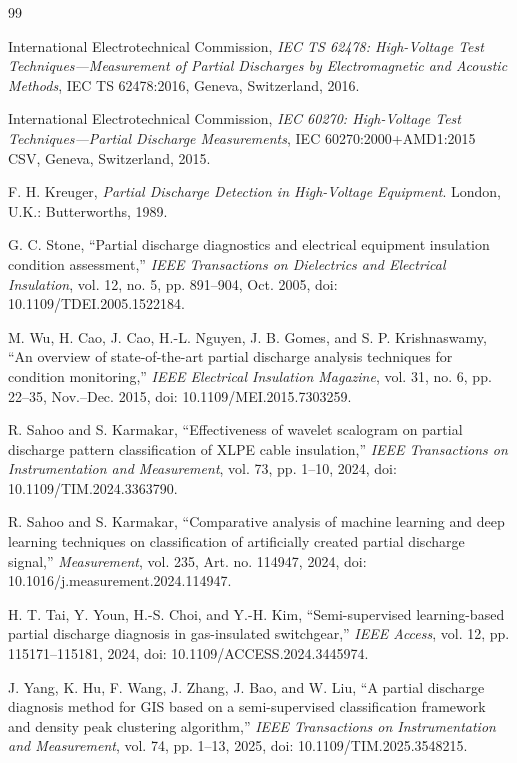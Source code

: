 \documentclass[journal]{IEEEtran}
\newcommand{\1}{\mathbf{1}}
\begin{document}
\begin{thebibliography}{99}

International Electrotechnical Commission,
\emph{IEC TS 62478: High-Voltage Test Techniques---Measurement of Partial Discharges by Electromagnetic and Acoustic Methods},
IEC TS 62478:2016, Geneva, Switzerland, 2016.

International Electrotechnical Commission,
\emph{IEC 60270: High-Voltage Test Techniques---Partial Discharge Measurements},
IEC 60270:2000+AMD1:2015 CSV, Geneva, Switzerland, 2015.

F. H. Kreuger,
\emph{Partial Discharge Detection in High-Voltage Equipment}.
London, U.K.: Butterworths, 1989.

G. C. Stone,
``Partial discharge diagnostics and electrical equipment insulation condition assessment,''
\emph{IEEE Transactions on Dielectrics and Electrical Insulation},
vol. 12, no. 5, pp. 891--904, Oct. 2005,
doi: 10.1109/TDEI.2005.1522184.

M. Wu, H. Cao, J. Cao, H.-L. Nguyen, J. B. Gomes, and S. P. Krishnaswamy,
``An overview of state-of-the-art partial discharge analysis techniques for condition monitoring,''
\emph{IEEE Electrical Insulation Magazine},
vol. 31, no. 6, pp. 22--35, Nov.--Dec. 2015,
doi: 10.1109/MEI.2015.7303259.

R. Sahoo and S. Karmakar,
``Effectiveness of wavelet scalogram on partial discharge pattern classification of XLPE cable insulation,''
\emph{IEEE Transactions on Instrumentation and Measurement},
vol. 73, pp. 1--10, 2024,
doi: 10.1109/TIM.2024.3363790.

R. Sahoo and S. Karmakar,
``Comparative analysis of machine learning and deep learning techniques on classification of artificially created partial discharge signal,''
\emph{Measurement},
vol. 235, Art. no. 114947, 2024,
doi: 10.1016/j.measurement.2024.114947.

H. T. Tai, Y. Youn, H.-S. Choi, and Y.-H. Kim,
``Semi-supervised learning-based partial discharge diagnosis in gas-insulated switchgear,''
\emph{IEEE Access},
vol. 12, pp. 115171--115181, 2024,
doi: 10.1109/ACCESS.2024.3445974.

J. Yang, K. Hu, F. Wang, J. Zhang, J. Bao, and W. Liu,
``A partial discharge diagnosis method for GIS based on a semi-supervised classification framework and density peak clustering algorithm,''
\emph{IEEE Transactions on Instrumentation and Measurement},
vol. 74, pp. 1--13, 2025,
doi: 10.1109/TIM.2025.3548215.


\end{thebibliography}
\end{document}
